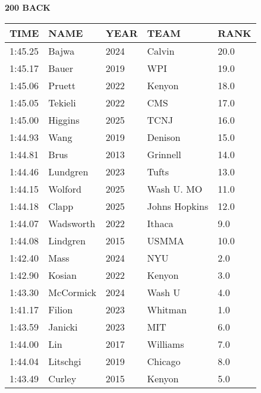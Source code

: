 \begin{minipage}[t]{0.48\textwidth}
\centering
\textbf{200 BACK}\\[0.05cm]
\begin{tabular}{@{}p{1.8cm}p{2.8cm}p{1.2cm}p{1.4cm}p{0.8cm}@{}}
\hline
\textbf{TIME} & \textbf{NAME} & \textbf{YEAR} & \textbf{TEAM} & \textbf{RANK} \\
\hline
1:45.25 & Bajwa & 2024 & Calvin & 20.0 \\
1:45.17 & Bauer & 2019 & WPI & 19.0 \\
1:45.06 & Pruett & 2022 & Kenyon & 18.0 \\
1:45.05 & Tekieli & 2022 & CMS & 17.0 \\
1:45.00 & Higgins & 2025 & TCNJ & 16.0 \\
1:44.93 & Wang & 2019 & Denison & 15.0 \\
1:44.81 & Brus & 2013 & Grinnell & 14.0 \\
1:44.46 & Lundgren & 2023 & Tufts & 13.0 \\
1:44.15 & Wolford & 2025 & Wash U. MO & 11.0 \\
1:44.18  & Clapp & 2025 & Johns Hopkins & 12.0 \\
1:44.07 & Wadsworth & 2022 & Ithaca & 9.0 \\
1:44.08 & Lindgren & 2015 & USMMA & 10.0 \\
1:42.40 & Mass & 2024 & NYU & 2.0 \\
1:42.90 & Kosian & 2022 & Kenyon & 3.0 \\
1:43.30 & McCormick & 2024 & Wash U & 4.0 \\
1:41.17 & Filion & 2023 & Whitman & 1.0 \\
1:43.59 & Janicki & 2023 & MIT & 6.0 \\
1:44.00 & Lin & 2017 & Williams & 7.0 \\
1:44.04 & Litschgi & 2019 & Chicago & 8.0 \\
1:43.49 & Curley & 2015 & Kenyon & 5.0 \\
\hline
\end{tabular}
\end{minipage}

\vspace{0.4cm}

